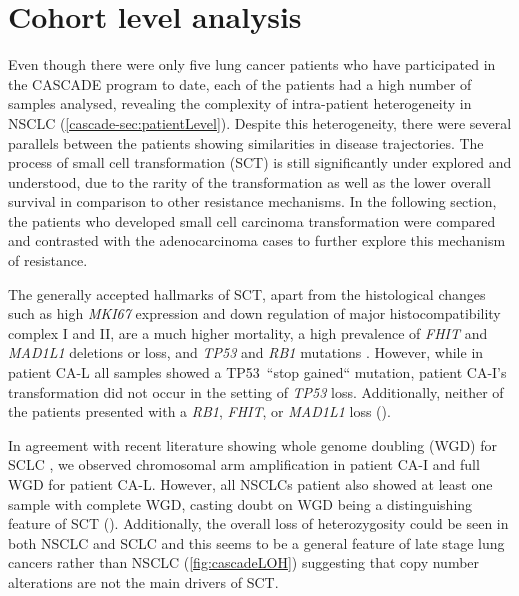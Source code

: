 

\section{Cohort level analysis}
\label{cascade-sec:cohortLevel}

Even though there were only five lung cancer patients who have participated in the CASCADE program to date, each of the patients had a high number of samples analysed, revealing the complexity of intra-patient heterogeneity in NSCLC (\autoref{cascade-sec:patientLevel}). Despite this heterogeneity, there were several parallels between the patients showing similarities in disease trajectories. The process of small cell transformation (SCT) is still significantly under explored and understood, due to the rarity of the transformation as well as the lower overall survival in comparison to other resistance mechanisms. In the following section, the patients who developed small cell carcinoma transformation were compared and contrasted with the adenocarcinoma cases to further explore this mechanism of resistance.

The generally accepted hallmarks of SCT, apart from the histological changes such as high \textit{MKI67} expression and down regulation of major histocompatibility complex I and II, are a much higher mortality, a high prevalence of \textit{FHIT} and \textit{MAD1L1} deletions or loss, and \textit{TP53} and \textit{RB1} mutations \cite{Meerbeeck2011,Raso2021}. However, while in patient CA-L all samples showed a TP53~``stop gained`` mutation, patient CA-I's transformation did not occur in the setting of  \textit{TP53} loss. Additionally, neither of the patients presented with a \textit{RB1}, \textit{FHIT}, or \textit{MAD1L1} loss (). 

In agreement with recent literature showing whole genome doubling (WGD) for SCLC \cite{Zhou2021}, we observed chromosomal arm amplification in patient CA-I and full WGD for patient CA-L. However, all NSCLCs patient also showed at least one sample with complete WGD, casting doubt on WGD being a distinguishing feature of SCT (). Additionally, the overall loss of heterozygosity could be seen in both NSCLC and SCLC and this seems to be a general feature of late stage lung cancers rather than NSCLC (\autoref{fig:cascadeLOH}) suggesting that copy number alterations are not the main drivers of SCT.


